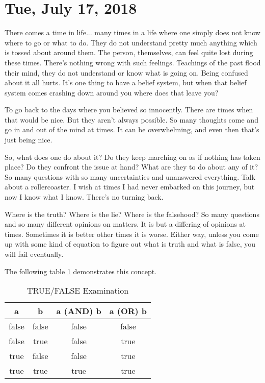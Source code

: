 \section{Tue, July 17, 2018}

There comes a time in life... many times in a life where one simply does not
know where to go or what to do. They do not understand pretty much anything
which is tossed about around them. The person, themselves, can feel quite lost
during these times. There's nothing wrong with such feelings. Teachings of the
past flood their mind, they do not understand or know what is going on. Being
confused about it all hurts. It's one thing to have a belief system, but when
that belief system comes crashing down around you where does that leave you?

To go back to the days where you believed so innocently. There are times when
that would be nice. But they aren't always possible. So many thoughts come and
go in and out of the mind at times. It can be overwhelming, and even then that's
just being nice.

So, what does one do about it? Do they keep marching on as if nothing has taken
place? Do they confront the issue at hand? What are they to do about any of it?
So many questions with so many uncertainties and unanswered everything. Talk
about a rollercoaster. I wish at times I had never embarked on this journey, but
now I know what I know. There's no turning back.

Where is the truth? Where is the lie? Where is the falsehood? So many questions
and so many different opinions on matters. It is but a differing of opinions at
times. Sometimes it is better other times it is worse. Either way, unless you
come up with some kind of equation to figure out what is truth and what is
false, you will fail eventually.

The following table \ref{table:1} demonstrates this concept.

\begin{table}[h!]
\centering
\begin{tabular}{|c|c|c|c|}
\hline
a     & b     & a (AND) b      & a (OR) b    \\ \hline
false & false & false          & false       \\ \hline
false & true  & false          & true        \\ \hline
true  & false & false          & true        \\ \hline
true  & true  & true           & true        \\ \hline
\end{tabular}
\caption{TRUE/FALSE Examination}
\label{table:1}
\end{table}

